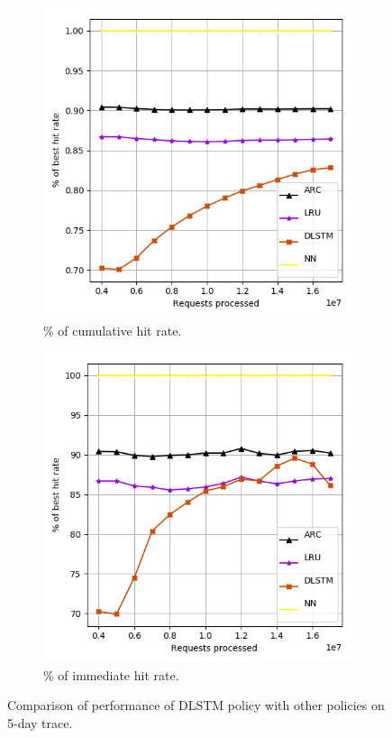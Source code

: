 \begin{figure}[b!]
	\centering
	\captionsetup{justification=centering}
	\begin{subfigure}[b]{0.49\linewidth}
		\includegraphics[width=\linewidth]{pics/dlstm_cum.png}
		\caption{\% of cumulative hit rate.}
	\end{subfigure}
	\begin{subfigure}[b]{0.49\linewidth}
		\includegraphics[width=\linewidth]{pics/dlstm_i.png}
		\caption{\% of immediate hit rate.}
	\end{subfigure}
	\caption{Comparison of performance of DLSTM policy with other policies on 5-day trace.}
	\label{fig:dlstm}
\end{figure}

